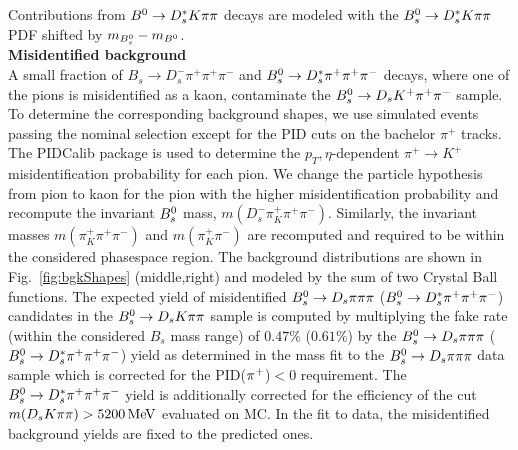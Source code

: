 Contributions from ${{B}^0}\rightarrow D_s^{*}K{\pi}{\pi}$ decays are modeled with the ${{B}^0_{s}}\rightarrow D_s^{*}K{\pi}{\pi}$ PDF  shifted by $m_{{{B}^0_{s}}} - m_{{{B}^0}}$. \\

\noindent\textbf{Misidentified background}  \\
A small fraction of $B_s \to D_s^- \pi^+ \pi^+ \pi^-$ and ${{B}^0_{s}}\rightarrow D_s^{*}\pi^+ \pi^+ \pi^-$ decays, where one of the pions is misidentified as a kaon, contaminate the 
${{B}^0_{s}}\rightarrow D_s K^+ \pi^+ \pi^-$ sample.
To determine the corresponding background shapes, we use simulated events passing the nominal selection
except for the PID cuts on the bachelor $\pi^+$ tracks. 
The \textsf{PIDCalib} package is used to determine the $p_T,\eta$-dependent $\pi^+\rightarrow K^+$ misidentification probability for each pion. 
We change the particle hypothesis from pion to kaon for the pion with the higher misidentification probability and recompute the invariant ${{B}^0_{s}}$ mass, $m(D_s^- \pi^+_K \pi^+ \pi^- )$. 
Similarly, the invariant masses $m(\pi^+_K \pi^+ \pi^- )$ and $m(\pi^+_K \pi^-)$ are recomputed and required to be within the considered phasespace region.
The background distributions are shown in Fig.~\ref{fig:bgkShapes} (middle,right) and modeled by the sum of two Crystal Ball functions. 
The expected yield of misidentified ${{B}^0_{s}}\rightarrow{\ensuremath{{D}_{s}}}{\ensuremath{\pi}}{\ensuremath{\pi}}{\ensuremath{\pi}}$ (${{B}^0_{s}}\rightarrow D_s^{*}\pi^+ \pi^+ \pi^-$) candidates in the ${{B}^0_{s}}\rightarrow{\ensuremath{{D}_{s}}} K{\pi}{\pi}$ sample is computed 
by multiplying the fake rate (within the considered $B_s$ mass range) of $0.47\%$ ($0.61\%$) %
by the ${{B}^0_{s}}\rightarrow{\ensuremath{{D}_{s}}}{\ensuremath{\pi}}{\ensuremath{\pi}}{\ensuremath{\pi}}$ (${{B}^0_{s}}\rightarrow D_s^{*}\pi^+ \pi^+ \pi^-$) yield as determined in the mass fit to the ${{B}^0_{s}}\rightarrow{\ensuremath{{D}_{s}}}{\ensuremath{\pi}}{\ensuremath{\pi}}{\ensuremath{\pi}}$ data sample which is 
corrected for the PID(${{\pi}^+}$)$<0$ requirement.  
The ${{B}^0_{s}}\rightarrow D_s^{*}\pi^+ \pi^+ \pi^-$ yield is additionally corrected for the efficiency of the cut $m({{D}_{s}} K{\pi}{\pi})>5200\mathrm{\,Me\kern -0.1em V}$ evaluated on MC.
In the fit to data, the misidentified background yields are fixed to the predicted ones.

